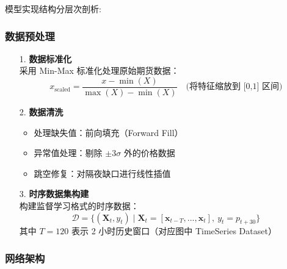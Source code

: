 \documentclass[a4paper,12pt]{ctexart}
\begin{document}
模型实现结构分层次剖析:

\subsubsection{数据预处理}
\begin{itemize}
  \item[1.] \textbf{数据标准化} \\
  采用 Min-Max 标准化处理原始期货数据：
  \begin{equation}
  x_{\text{scaled}} = \frac{x - \min(X)}{\max(X) - \min(X)} \quad \text{(将特征缩放到 [0,1] 区间)}
  \end{equation}

  \item[2.] \textbf{数据清洗}
  \begin{itemize}
    \item 处理缺失值：前向填充（Forward Fill）
    \item 异常值处理：剔除 $\pm 3\sigma$ 外的价格数据
    \item 跳空修复：对隔夜缺口进行线性插值
  \end{itemize}

  \item[3.] \textbf{时序数据集构建} \\
  构建监督学习格式的时序数据：
  \begin{equation}
  \mathcal{D} = \{ (\mathbf{X}_t, y_t) \mid \mathbf{X}_t = [\mathbf{x}_{t-T}, ..., \mathbf{x}_t], \ y_t = p_{t+30} \}
  \end{equation}
  其中 $T=120$ 表示 2 小时历史窗口（对应图中 TimeSeries Dataset）
\end{itemize}


\subsubsection{网络架构}
\end{document}
